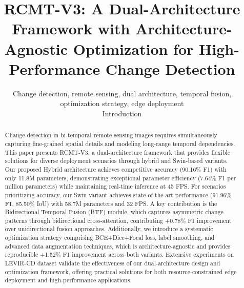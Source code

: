 \documentclass[journal]{IEEEtran}
\begin{document}
\title{RCMT-V3: A Dual-Architecture Framework with Architecture-Agnostic Optimization for High-Performance Change Detection}

\author{

\maketitle

\begin{abstract}
Change detection in bi-temporal remote sensing images requires simultaneously capturing fine-grained spatial details and modeling long-range temporal dependencies. This paper presents RCMT-V3, a dual-architecture framework that provides flexible solutions for diverse deployment scenarios through hybrid and Swin-based variants. Our proposed Hybrid architecture achieves competitive accuracy (90.16\% F1) with only 11.8M parameters, demonstrating exceptional parameter efficiency (7.64\% F1 per million parameters) while maintaining real-time inference at 45 FPS. For scenarios prioritizing accuracy, our Swin variant achieves state-of-the-art performance (91.96\% F1, 85.50\% IoU) with 58.7M parameters and 32 FPS. A key contribution is the Bidirectional Temporal Fusion (BTF) module, which captures asymmetric change patterns through bidirectional cross-attention, contributing +0.78\% F1 improvement over unidirectional fusion approaches. Additionally, we introduce a systematic optimization strategy comprising BCE+Dice+Focal loss, label smoothing, and advanced data augmentation techniques, which is architecture-agnostic and provides reproducible +1.52\% F1 improvement across both variants. Extensive experiments on LEVIR-CD dataset validate the effectiveness of our dual-architecture design and optimization framework, offering practical solutions for both resource-constrained edge deployment and high-performance applications.
\end{abstract}

\begin{IEEEkeywords}
Change detection, remote sensing, dual architecture, temporal fusion, optimization strategy, edge deployment
\end{IEEEkeywords}

\section{Introduction}

}
\end{document}
